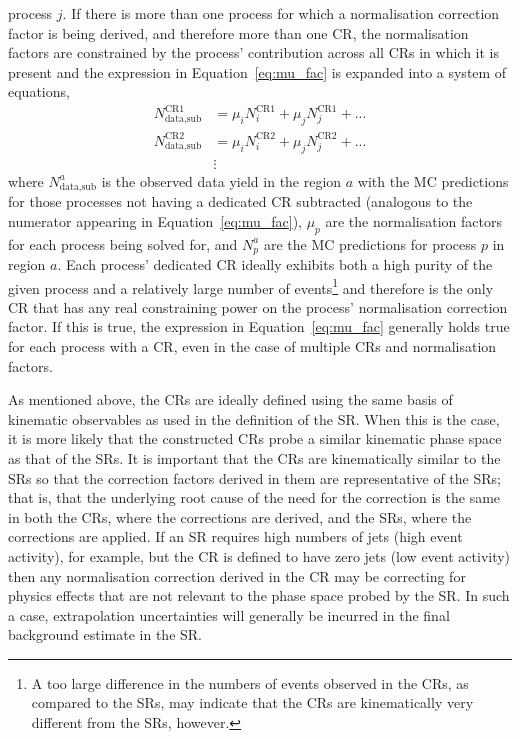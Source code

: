 process $j$.
If there is more than one process for which a normalisation correction factor is being derived, and therefore
more than one CR, the normalisation factors are constrained by the process' contribution across all CRs in which
it is present and the expression in Equation~\ref{eq:mu_fac} is expanded into a system of equations,
\begin{align}
    N_{\text{data,sub}}^{\text{CR1}} &= \mu_i N_i^{\text{CR1}} + \mu_j N_j^{\text{CR1}} + ... \nonumber \\
    N_{\text{data,sub}}^{\text{CR2}} &= \mu_i N_i^{\text{CR2}} + \mu_j N_j^{\text{CR2}} + ...     \label{eq:mu_fac_expand} \\
        &\vdots \nonumber
\end{align}
where $N_{\text{data,sub}}^{a}$ is the observed data yield in the region $a$ with the MC predictions
for those processes not having a dedicated  CR subtracted (analogous to the numerator appearing in Equation~\ref{eq:mu_fac}),
$\mu_p$ are the normalisation factors for each process being solved for, and $N_p^{a}$ are the MC predictions
for process $p$ in region $a$.
Each process' dedicated CR ideally exhibits both a high purity of the given process and a relatively large
number of events\footnote{A too large difference in the numbers of events observed in the CRs, as compared to the SRs, may indicate
that the CRs are kinematically very different from the SRs, however.} and therefore
is the only CR that has any real constraining power on the process' normalisation correction factor.
If this is true, the expression in Equation~\ref{eq:mu_fac} generally holds true for each process with a
CR, even in the case of multiple CRs and
normalisation factors.

As mentioned above, the CRs are ideally defined using the same basis of kinematic observables
as used in the definition of the SR.
When this is the case, it is more likely that the constructed CRs probe a similar kinematic
phase space as that of the SRs.
It is important that the CRs are kinematically similar to the SRs so that the correction factors
derived in them are representative of the SRs; that is, that the underlying root cause of the need for the
correction is the same in both the CRs, where the corrections are derived, and the SRs, where
the corrections are applied.
If an SR requires high numbers of jets (high event activity), for example, but the CR is defined to have zero
jets (low event activity) then any normalisation correction derived in the CR may be correcting for physics effects
that are not relevant to the phase space probed by the SR.
In such a case, extrapolation uncertainties will generally be incurred in the final background estimate in the SR.

